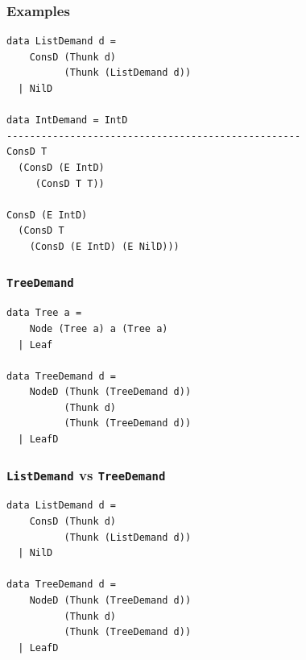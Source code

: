 \documentclass{beamer}
\begin{document}

\begin{frame}[fragile]
\frametitle{Examples}
\begin{verbatim}
data ListDemand d =
    ConsD (Thunk d)
          (Thunk (ListDemand d))
  | NilD

data IntDemand = IntD
---------------------------------------------------
ConsD T
  (ConsD (E IntD)
     (ConsD T T))

ConsD (E IntD)
  (ConsD T
    (ConsD (E IntD) (E NilD)))
\end{verbatim}
\end{frame}


\begin{frame}[fragile]
\frametitle{\texttt{TreeDemand}}
\begin{verbatim}
data Tree a =
    Node (Tree a) a (Tree a)
  | Leaf

data TreeDemand d =
    NodeD (Thunk (TreeDemand d))
          (Thunk d)
          (Thunk (TreeDemand d))
  | LeafD
\end{verbatim}
\end{frame}


\begin{frame}[fragile]
\frametitle{\texttt{ListDemand} vs \texttt{TreeDemand}}
\begin{verbatim}
data ListDemand d =
    ConsD (Thunk d)
          (Thunk (ListDemand d))
  | NilD

data TreeDemand d =
    NodeD (Thunk (TreeDemand d))
          (Thunk d)
          (Thunk (TreeDemand d))
  | LeafD
\end{verbatim}
\end{frame}
\end{document}
